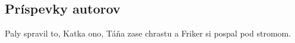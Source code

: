 \subsection{Príspevky autorov}
Paly spravil to, Katka ono, Táňa zase chrastu a Friker si pospal pod stromom.
